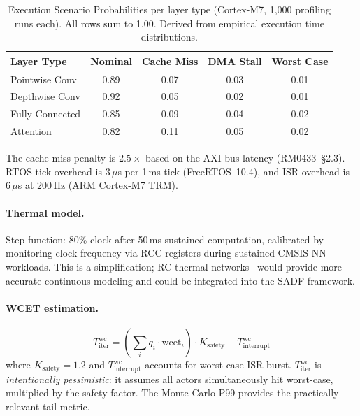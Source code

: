 \documentclass[journal]{IEEEtran}
\begin{document}
\begin{table}[htbp]
\centering
\caption{Execution Scenario Probabilities per layer type (Cortex-M7, 1{,}000 profiling runs each). All rows sum to 1.00. Derived from empirical execution time distributions.}
\label{tab:scenarios}
\begin{tabular}{@{}lcccc@{}}
\toprule
Layer Type & Nominal & Cache Miss & DMA Stall & Worst Case \\
\midrule
Pointwise Conv & 0.89 & 0.07 & 0.03 & 0.01 \\
Depthwise Conv & 0.92 & 0.05 & 0.02 & 0.01 \\
Fully Connected & 0.85 & 0.09 & 0.04 & 0.02 \\
Attention & 0.82 & 0.11 & 0.05 & 0.02 \\
\bottomrule
\end{tabular}
\end{table}

The cache miss penalty is $2.5\times$ based on the AXI bus latency (RM0433~\S2.3). RTOS tick overhead is 3\,$\mu$s per 1\,ms tick (FreeRTOS~10.4), and ISR overhead is 6\,$\mu$s at 200\,Hz (ARM Cortex-M7 TRM).

\paragraph{Thermal model.}
Step function: 80\% clock after 50\,ms sustained computation, calibrated by monitoring clock frequency via RCC registers during sustained CMSIS-NN workloads.
This is a simplification; RC thermal networks~\cite{skadron2004temperature} would provide more accurate continuous modeling and could be integrated into the SADF framework.

\paragraph{WCET estimation.}
\begin{equation}
T_{\mathrm{iter}}^{\mathrm{wc}} = \left(\sum_i q_i \cdot \mathrm{wcet}_i\right) \cdot K_{\mathrm{safety}} + T_{\mathrm{interrupt}}^{\mathrm{wc}}
\label{eq:wcet}
\end{equation}
where $K_{\mathrm{safety}} = 1.2$ and $T_{\mathrm{interrupt}}^{\mathrm{wc}}$ accounts for worst-case ISR burst.
$T_{\mathrm{iter}}^{\mathrm{wc}}$ is \emph{intentionally pessimistic}: it assumes all actors simultaneously hit worst-case, multiplied by the safety factor.
The Monte Carlo P99 provides the practically relevant tail metric.
\end{document}
